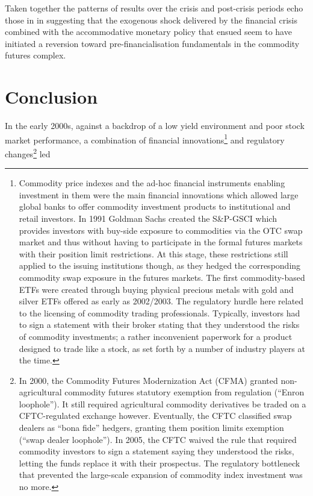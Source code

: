 \documentclass[
  authoryear,
  preprint,
  3p]{elsarticle}
\begin{document}
\medskip

Taken together the patterns of results over the crisis and post-crisis
periods echo those in \citet{basu_definancialisation} in suggesting that
the exogenous shock delivered by the financial crisis combined with the
accommodative monetary policy that ensued seem to have initiated a
reversion toward pre-financialisation fundamentals in the commodity
futures complex.

\newpage

\section{Conclusion}\label{conclusion}

In the early 2000s, against a backdrop of a low yield environment and
poor stock market performance, a combination of financial
innovations\footnote{Commodity price indexes and the ad-hoc financial
  instruments enabling investment in them were the main financial
  innovations which allowed large global banks to offer commodity
  investment products to institutional and retail investors. In 1991
  Goldman Sachs created the S\&P-GSCI which provides investors with
  buy-side exposure to commodities via the OTC swap market and thus
  without having to participate in the formal futures markets with their
  position limit restrictions. At this stage, these restrictions still
  applied to the issuing institutions though, as they hedged the
  corresponding commodity swap exposure in the futures markets. The
  first commodity-based ETFs were created through buying physical
  precious metals with gold and silver ETFs offered as early as
  2002/2003. The regulatory hurdle here related to the licensing of
  commodity trading professionals. Typically, investors had to sign a
  statement with their broker stating that they understood the risks of
  commodity investments; a rather inconvenient paperwork for a product
  designed to trade like a stock, as set forth by a number of industry
  players at the time.} and regulatory changes\footnote{In 2000, the
  Commodity Futures Modernization Act (CFMA) granted non-agricultural
  commodity futures statutory exemption from regulation (``Enron
  loophole''). It still required agricultural commodity derivatives be
  traded on a CFTC-regulated exchange however. Eventually, the CFTC
  classified swap dealers as ``bona fide'' hedgers, granting them
  position limits exemption (``swap dealer loophole''). In 2005, the
  CFTC waived the rule that required commodity investors to sign a
  statement saying they understood the risks, letting the funds replace
  it with their prospectus. The regulatory bottleneck that prevented the
  large-scale expansion of commodity index investment was no more.} led
\end{document}
